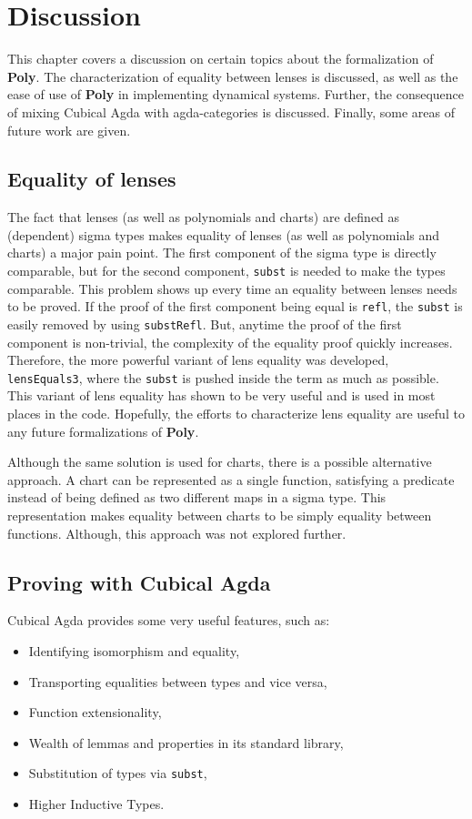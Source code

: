 \chapter{Discussion}\label{chapter:discussion}
This chapter covers a discussion on certain topics about the formalization of \textbf{Poly}. The characterization of equality between lenses is discussed, as well as the ease of use of \textbf{Poly} in implementing dynamical systems. Further, the consequence of mixing Cubical Agda with agda-categories is discussed. Finally, some areas of future work are given.

\section{Equality of lenses}
The fact that lenses (as well as polynomials and charts) are defined as (dependent) sigma types makes equality of lenses (as well as polynomials and charts) a major pain point. The first component of the sigma type is directly comparable, but for the second component, \texttt{subst} is needed to make the types comparable. This problem shows up every time an equality between lenses needs to be proved. If the proof of the first component being equal is \texttt{refl}, the \texttt{subst} is easily removed by using \texttt{substRefl}. But, anytime the proof of the first component is non-trivial, the complexity of the equality proof quickly increases. Therefore, the more powerful variant of lens equality was developed, \texttt{lensEquals3}, where the \texttt{subst} is pushed inside the term as much as possible. This variant of lens equality has shown to be very useful and is used in most places in the code.
Hopefully, the efforts to characterize lens equality are useful to any future formalizations of \textbf{Poly}.

Although the same solution is used for charts, there is a possible alternative approach.
A chart can be represented as a single function, satisfying a predicate instead of being defined as two different maps in a sigma type.
This representation makes equality between charts to be simply equality between functions. Although, this approach was not explored further.


\section{Proving with Cubical Agda}
Cubical Agda provides some very useful features, such as:
\begin{itemize}
    \item Identifying isomorphism and equality,
    \item Transporting equalities between types and vice versa,
    \item Function extensionality,
    \item Wealth of lemmas and properties in its standard library,
    \item Substitution of types via \texttt{subst},
    \item Higher Inductive Types.
\end{itemize}

